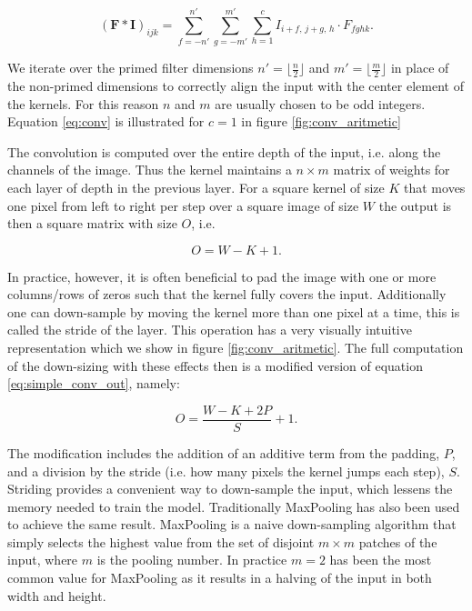 \begin{equation}\label{eq:conv}
(\mathbf{F}*\mathbf{I})_{ijk} = 
\sum_{f=-n'}^{n'}\sum_{g=-m'}^{m'}\sum_{h=1} ^c
I_{i+f,\, j+g,\, h}\cdot F_{fghk}.
\end{equation}

\noindent We iterate over the primed filter dimensions $n'=\lfloor\frac{n}{2} \rfloor$ and $m' = \lfloor \frac{m}{2} \rfloor$ in place of the non-primed dimensions to correctly align the input with the center element of the kernels. For this reason $n$ and $m$ are usually chosen to be odd integers. Equation \ref{eq:conv} is illustrated for $c=1$ in figure \ref{fig:conv_aritmetic}   

The convolution is computed over the entire depth of the input, i.e. along the channels of the image. Thus the kernel maintains a $n\times m$ matrix of weights for each layer of depth in the previous layer. For a square kernel of size $K$ that moves one pixel from left to right per step over a square image of size $W$ the output is then a square matrix with size $O$, i.e.

\begin{equation}\label{eq:simple_conv_out}
O = W - K +1.
\end{equation}

\noindent In practice, however, it is often beneficial to pad the image with one or more columns/rows of zeros such that the kernel fully covers the input. Additionally one can down-sample by moving the kernel more than one pixel at a time, this is called the stride of the layer. This operation has a very visually intuitive representation which we show in figure \ref{fig:conv_aritmetic}. The full computation of the down-sizing with these effects then is a modified version of equation \ref{eq:simple_conv_out}, namely: 

\begin{equation}\label{eq:conv_out}
O = \frac{W - K + 2P}{S} + 1.
\end{equation} 

\noindent The modification includes the addition of an additive term from the padding, $P$, and a division by the stride (i.e. how many pixels the kernel jumps each step), $S$. Striding provides a convenient way to down-sample the input, which lessens the memory needed to train the model. Traditionally MaxPooling has also been used to achieve the same result. MaxPooling is a naive down-sampling algorithm that simply selects the highest value from the set of disjoint $m\times m$ patches of the input, where $m$ is the pooling number. In practice $m=2$ has been the most common value for MaxPooling as it results in a halving of the input in both width and height.

